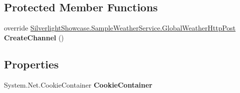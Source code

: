 \subsection*{Protected Member Functions}
\begin{DoxyCompactItemize}
\item 
\hypertarget{class_silverlight_showcase_1_1_sample_weather_service_1_1_global_weather_http_post_client_a0eec5005cb40883c3f5c61939228df87}{
override \hyperlink{interface_silverlight_showcase_1_1_sample_weather_service_1_1_global_weather_http_post}{SilverlightShowcase.SampleWeatherService.GlobalWeatherHttpPost} {\bfseries CreateChannel} ()}
\label{class_silverlight_showcase_1_1_sample_weather_service_1_1_global_weather_http_post_client_a0eec5005cb40883c3f5c61939228df87}

\end{DoxyCompactItemize}
\subsection*{Properties}
\begin{DoxyCompactItemize}
\item 
\hypertarget{class_silverlight_showcase_1_1_sample_weather_service_1_1_global_weather_http_post_client_ad6c1dec6378ab96f33adb4ced248ae6e}{
System.Net.CookieContainer {\bfseries CookieContainer}}
\label{class_silverlight_showcase_1_1_sample_weather_service_1_1_global_weather_http_post_client_ad6c1dec6378ab96f33adb4ced248ae6e}

\end{DoxyCompactItemize}
